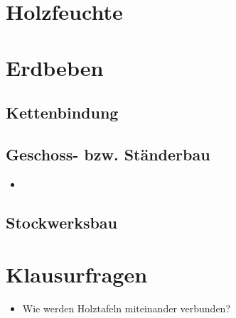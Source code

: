 \documentclass[fleqn,twoside]{article}
\begin{document}
\newpage
\section{Holzfeuchte}


\newpage
\section{Erdbeben}


\subsection{Kettenbindung}


\subsection{Geschoss- bzw. Ständerbau}
    \begin{minipage}{0.6\textwidth}
    \begin{itemize}
        \item 
    \end{itemize}
    \end{minipage}
    \begin{minipage}{0.4\textwidth}
    \end{minipage}
    
    
\subsection{Stockwerksbau}


\section{Klausurfragen}

    \begin{itemize}
        \item Wie werden Holztafeln miteinander verbunden?
    \end{itemize}
 
 
 
 
\end{document}
